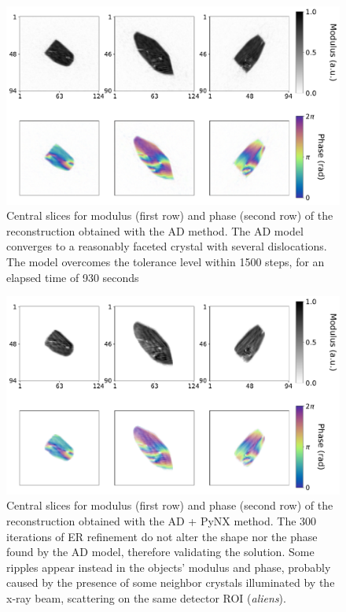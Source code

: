 \begin{figure}[H]
  \centering
  \includegraphics[width=\textwidth]{figures/AD/ad_mouad.pdf}
  \caption{Central slices for modulus (first row) and phase (second row) of the reconstruction obtained with the AD method.
  The AD model converges to a reasonably faceted crystal with several dislocations. The model overcomes the tolerance level 
  within 1500 steps, for an elapsed time of 930 seconds}
  \label{fig:ad_mouad}
\end{figure}

\begin{figure}[H]
  \centering
  \includegraphics[width=\textwidth]{figures/AD/ad_pynx_mouad.pdf}
  \caption{Central slices for modulus (first row) and phase (second row) of the reconstruction obtained with the AD + PyNX method.
  The 300 iterations of ER refinement do not alter the shape nor the phase found by the AD model, therefore validating the solution.
  Some ripples appear instead in the objects' modulus and phase, probably caused by the presence of some neighbor crystals illuminated by the 
  x-ray beam, scattering on the same detector ROI (\textit{aliens}). }
  \label{fig:adpynx_mouad}
\end{figure}

